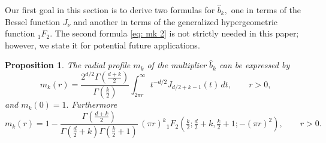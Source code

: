 \documentclass[a4paper,12pt,reqno]{amsart}
\numberwithin{equation}{section}
\newtheorem{proposition}[theorem]{Proposition}
\theoremstyle{definition}
\begin{document}
Our first goal in this section is to derive two formulas for $\widehat{b}_k,$ one in terms of the Bessel function $J_\nu$ and another in terms of the generalized hypergeometric function $_1F_2.$ The second formula \eqref{eq: mk 2} is  not strictly needed in  this paper; however, we state it for potential future applications.
\begin{proposition}
\label{pro: mk}
The radial profile $m_k$ of the multiplier $\widehat{b}_k$ can be expressed by 
 \begin{equation}
\label{eq: mk 1}
m_k(r)=\frac{2^{d/2} \Gamma(\frac{d + k}{2})}{\Gamma(\frac{k}{2})} \int_{2\pi r}^\infty t^{-d/2} J_{d/2 + k - 1}(t) \, dt,\qquad r>0,
\end{equation}
and $m_k(0)=1.$ Furthermore
\begin{equation}
\label{eq: mk 2}
 m_k(r) = 1 - \frac{\Gamma(\frac{d + k}{2})}{\Gamma(\frac{d}{2} + k) \Gamma(\frac{k}{2} + 1)} \, (\pi r)^k {_1F_2}(\tfrac{k}{2}; \tfrac{d}{2} + k, \tfrac{k}{2} + 1; -(\pi r)^2),\qquad r>0.
 \end{equation}
\end{proposition}
\end{document}
